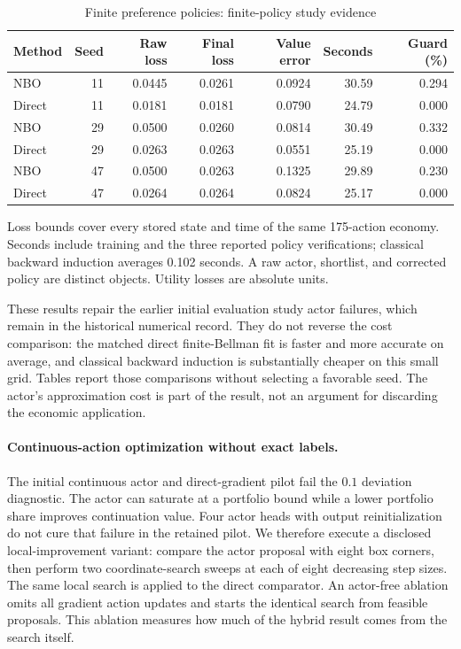 \begin{table}[htbp]\centering
\caption{Finite preference policies: finite-policy study evidence}
\begin{small}\begin{tabular}{lrrrrrr}
\toprule
Method & Seed & Raw loss & Final loss & Value error & Seconds & Guard (\%) \\
\midrule
NBO & 11 & 0.0445 & 0.0261 & 0.0924 & 30.59 & 0.294 \\
Direct & 11 & 0.0181 & 0.0181 & 0.0790 & 24.79 & 0.000 \\
NBO & 29 & 0.0500 & 0.0260 & 0.0814 & 30.49 & 0.332 \\
Direct & 29 & 0.0263 & 0.0263 & 0.0551 & 25.19 & 0.000 \\
NBO & 47 & 0.0500 & 0.0263 & 0.1325 & 29.89 & 0.230 \\
Direct & 47 & 0.0264 & 0.0264 & 0.0824 & 25.17 & 0.000 \\
\bottomrule\end{tabular}\end{small}
\par\smallskip\begin{minipage}{0.96\linewidth}\footnotesize Loss bounds cover every stored state and time of the same 175-action economy. Seconds include training and the three reported policy verifications; classical backward induction averages 0.102 seconds. A raw actor, shortlist, and corrected policy are distinct objects. Utility losses are absolute units.\end{minipage}
\end{table}


These results repair the earlier initial evaluation study actor failures, which remain in the historical numerical record. They do not reverse the cost comparison: the matched direct finite-Bellman fit is faster and more accurate on average, and classical backward induction is substantially cheaper on this small grid. Tables report those comparisons without selecting a favorable seed. The actor's approximation cost is part of the result, not an argument for discarding the economic application.

\paragraph*{Continuous-action optimization without exact labels.}
The initial continuous actor and direct-gradient pilot fail the $0.1$ deviation diagnostic. The actor can saturate at a portfolio bound while a lower portfolio share improves continuation value. Four actor heads with output reinitialization do not cure that failure in the retained pilot. We therefore execute a disclosed local-improvement variant: compare the actor proposal with eight box corners, then perform two coordinate-search sweeps at each of eight decreasing step sizes. The same local search is applied to the direct comparator. An actor-free ablation omits all gradient action updates and starts the identical search from feasible proposals. This ablation measures how much of the hybrid result comes from the search itself.

